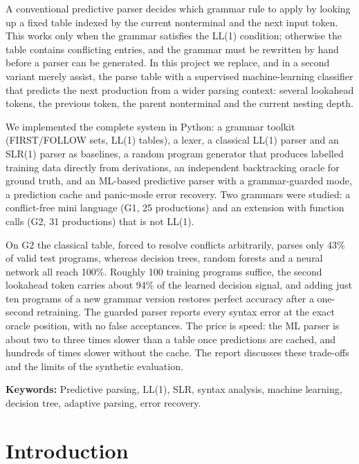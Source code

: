 \documentclass[12pt,a4paper]{article}
\begin{document}
A conventional predictive parser decides which grammar rule to apply by looking
up a fixed table indexed by the current nonterminal and the next input token.
This works only when the grammar satisfies the LL(1) condition; otherwise the
table contains conflicting entries, and the grammar must be rewritten by hand
before a parser can be generated. In this project we replace, and in a second
variant merely assist, the parse table with a supervised machine-learning
classifier that predicts the next production from a wider parsing context:
several lookahead tokens, the previous token, the parent nonterminal and the
current nesting depth.

We implemented the complete system in Python: a grammar toolkit (FIRST/FOLLOW
sets, LL(1) tables), a lexer, a classical LL(1) parser and an SLR(1) parser as
baselines, a random program generator that produces labelled training data
directly from derivations, an independent backtracking oracle for ground
truth, and an ML-based predictive parser with a grammar-guarded mode, a
prediction cache and panic-mode error recovery. Two grammars were studied: a
conflict-free mini language (G1, 25 productions) and an extension with
function calls (G2, 31 productions) that is not LL(1).

On G2 the classical table, forced to resolve conflicts arbitrarily, parses only
43\% of valid test programs, whereas decision trees, random forests and a
neural network all reach 100\%. Roughly 100 training programs suffice, the
second lookahead token carries about 94\% of the learned decision signal, and
adding just ten programs of a new grammar version restores perfect accuracy
after a one-second retraining. The guarded parser reports every syntax error at
the exact oracle position, with no false acceptances. The price is speed: the
ML parser is about two to three times slower than a table once predictions are
cached, and hundreds of times slower without the cache. The report discusses
these trade-offs and the limits of the synthetic evaluation.

\medskip
\noindent\textbf{Keywords:} Predictive parsing, LL(1), SLR, syntax analysis,
machine learning, decision tree, adaptive parsing, error recovery.

\newpage
\tableofcontents
\newpage

\section{Introduction}
\end{document}
